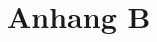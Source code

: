 %
%
\glsresetall
\let\raggedsection\centering 
\chapter{Anhang B}\label{chap.anhang_b}
\let\raggedsection\raggedright 
